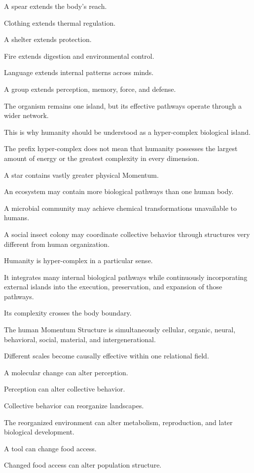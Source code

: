 A spear extends the body’s reach.

Clothing extends thermal regulation.

A shelter extends protection.

Fire extends digestion and environmental control.

Language extends internal patterns across minds.

A group extends perception, memory, force, and defense.

The organism remains one island, but its effective pathways operate through a wider network.

This is why humanity should be understood as a hyper-complex biological island.

The prefix hyper-complex does not mean that humanity possesses the largest amount of energy or the greatest complexity in every dimension.

A star contains vastly greater physical Momentum.

An ecosystem may contain more biological pathways than one human body.

A microbial community may achieve chemical transformations unavailable to humans.

A social insect colony may coordinate collective behavior through structures very different from human organization.

Humanity is hyper-complex in a particular sense.

It integrates many internal biological pathways while continuously incorporating external islands into the execution, preservation, and expansion of those pathways.

Its complexity crosses the body boundary.

The human Momentum Structure is simultaneously cellular, organic, neural, behavioral, social, material, and intergenerational.

Different scales become causally effective within one relational field.

A molecular change can alter perception.

Perception can alter collective behavior.

Collective behavior can reorganize landscapes.

The reorganized environment can alter metabolism, reproduction, and later biological development.

A tool can change food access.

Changed food access can alter population structure.

